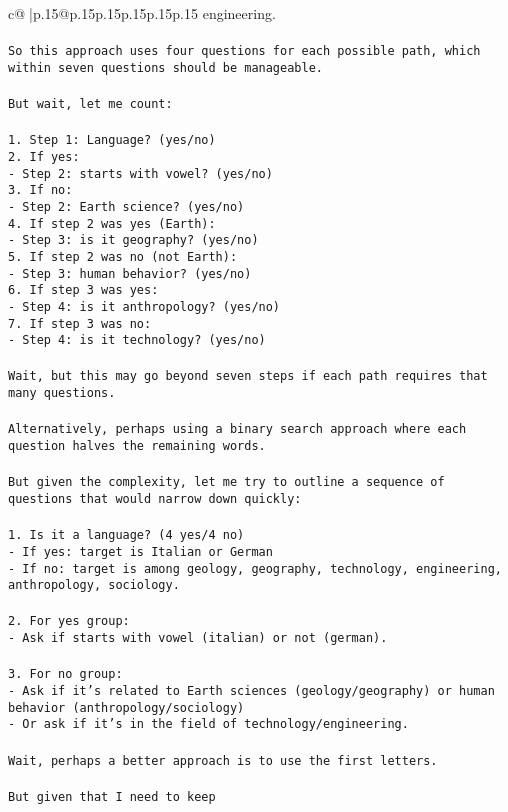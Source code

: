 \documentclass{article}
\begin{document}
{\begin{supertabular}{c@{$\;$}|p{.15\linewidth}@{}p{.15\linewidth}p{.15\linewidth}p{.15\linewidth}p{.15\linewidth}p{.15\linewidth}}
{{{engineering.\\ \tt \\ \tt So this approach uses four questions for each possible path, which within seven questions should be manageable.\\ \tt \\ \tt But wait, let me count:\\ \tt \\ \tt 1. Step 1: Language? (yes/no)\\ \tt 2. If yes:\\ \tt    - Step 2: starts with vowel? (yes/no)\\ \tt 3. If no:\\ \tt    - Step 2: Earth science? (yes/no)\\ \tt 4. If step 2 was yes (Earth):\\ \tt    - Step 3: is it geography? (yes/no)\\ \tt 5. If step 2 was no (not Earth):\\ \tt    - Step 3: human behavior? (yes/no)\\ \tt 6. If step 3 was yes:\\ \tt    - Step 4: is it anthropology? (yes/no)\\ \tt 7. If step 3 was no:\\ \tt    - Step 4: is it technology? (yes/no)\\ \tt \\ \tt Wait, but this may go beyond seven steps if each path requires that many questions.\\ \tt \\ \tt Alternatively, perhaps using a binary search approach where each question halves the remaining words.\\ \tt \\ \tt But given the complexity, let me try to outline a sequence of questions that would narrow down quickly:\\ \tt \\ \tt 1. Is it a language? (4 yes/4 no)\\ \tt    - If yes: target is Italian or German\\ \tt    - If no: target is among geology, geography, technology, engineering, anthropology, sociology.\\ \tt \\ \tt 2. For yes group:\\ \tt    - Ask if starts with vowel (italian) or not (german).\\ \tt \\ \tt 3. For no group:\\ \tt    - Ask if it's related to Earth sciences (geology/geography) or human behavior (anthropology/sociology)\\ \tt    - Or ask if it's in the field of technology/engineering.\\ \tt \\ \tt Wait, perhaps a better approach is to use the first letters.\\ \tt \\ \tt But given that I need to keep }}}
\end{supertabular}}
\end{document}
